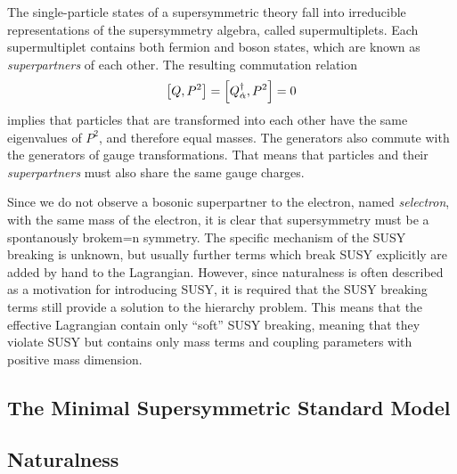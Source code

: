The single-particle states of a supersymmetric theory fall into irreducible representations of the supersymmetry algebra, called supermultiplets. Each supermultiplet contains both fermion and boson states, which are known as \emph{superpartners} of each other. The resulting commutation relation
\begin{equation}
\comm{Q}{P^2}=\comm{Q^{\dagger}_{\dot{\alpha}}}{P^2}=0
\end{equation}
implies that particles that are transformed into each other have the same eigenvalues of $P^2$, and therefore equal masses. The generators also commute with the generators of gauge transformations. That means that particles and their \emph{superpartners} must also share the same gauge charges.

Since we do not observe a bosonic superpartner to the electron, named \emph{selectron}, with the same mass of the electron, it is clear that supersymmetry must be a spontanously brokem=n symmetry. The specific mechanism of the SUSY breaking is unknown, but usually further terms which break SUSY explicitly are added by hand to the Lagrangian. However, since naturalness is often described as a motivation for introducing SUSY, it is required that the SUSY breaking terms still provide a solution to the hierarchy problem. This means that the effective Lagrangian contain only “soft” SUSY breaking, meaning that they violate SUSY but contains only mass terms and coupling parameters with positive mass dimension.

\subsection{The Minimal Supersymmetric Standard Model}
\subsection{Naturalness}
\label{sec:naturalness}


